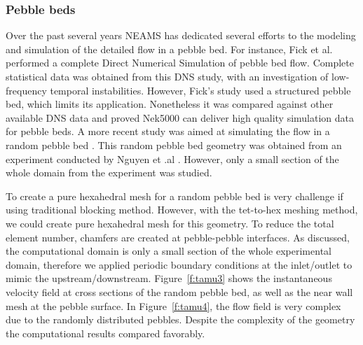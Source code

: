 \subsubsection{Pebble beds}

Over the past several years NEAMS has dedicated several efforts to the modeling and simulation of the detailed flow in a pebble bed. For instance, Fick et al. \cite{fick2017direct}  performed a complete Direct Numerical Simulation of pebble bed flow. Complete statistical data was obtained from this DNS study, with an investigation of low-frequency temporal instabilities. However, Fick's study \cite{fick2017direct} used a structured pebble bed, which limits its application. Nonetheless it was compared against other available DNS data and proved Nek5000 can deliver high quality simulation data for pebble beds. A more recent study was aimed at simulating the flow in a random pebble bed \cite{yildiz2020direct}. This random pebble bed geometry was obtained from an experiment conducted by Nguyen et .al \cite{nguyen2018time}. However, only a small section of the whole domain from the experiment was studied.

To create a pure hexahedral mesh for a random pebble bed is very challenge if using traditional blocking method. However, with the tet-to-hex meshing method, we could create pure hexahedral mesh for this geometry. To reduce the total element number, chamfers are created at pebble-pebble interfaces. As discussed, the computational domain is only a small section of the whole experimental domain, therefore we applied periodic boundary conditions at the inlet/outlet to mimic the upstream/downstream. Figure~\ref{f:tamu3} shows the instantaneous velocity field at cross sections of the random pebble bed, as well as the near wall mesh at the pebble surface. In Figure~\ref{f:tamu4}, the flow field is very complex due to the randomly distributed pebbles. Despite the complexity of the geometry the computational results compared favorably.

